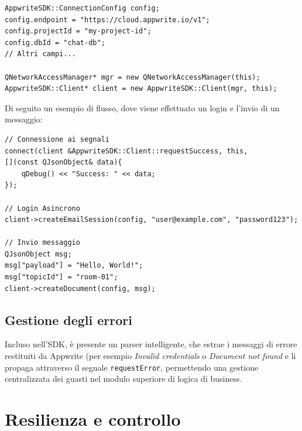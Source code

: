 \documentclass[a4paper, 11pt, twoside]{report}
\begin{document}
\begin{verbatim}
AppwriteSDK::ConnectionConfig config;
config.endpoint = "https://cloud.appwrite.io/v1";
config.projectId = "my-project-id";
config.dbId = "chat-db";
// Altri campi...

QNetworkAccessManager* mgr = new QNetworkAccessManager(this);
AppwriteSDK::Client* client = new AppwriteSDK::Client(mgr, this);
\end{verbatim}

Di seguito un esempio di flusso, dove viene effettuato un login e l'invio di un messaggio:

\begin{verbatim}
// Connessione ai segnali
connect(client &AppwriteSDK::Client::requestSuccess, this,
[](const QJsonObject& data){
    qDebug() << "Success: " << data;
});

// Login Asincrono
client->createEmailSession(config, "user@example.com", "password123");

// Invio messaggio
QJsonObject msg;
msg["payload"] = "Hello, World!";
msg["topicId"] = "room-01";
client->createDocument(config, msg);
\end{verbatim}

\subsection{Gestione degli errori}

Incluso nell'\gls{SDK}, è presente un parser intelligente, che estrae i messaggi di errore restituiti da Appwrite (per esempio
\textit{Invalid credentials} o \textit{Document not found} e li propaga attraverso il segnale \texttt{requestError}, 
permettendo una gestione centralizzata dei guasti nel modulo superiore di logica di business.

\section{Resilienza e controllo}
\end{document}
